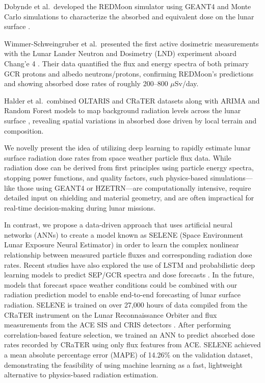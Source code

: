 \documentclass[conference]{IEEEtran}
\begin{document}
Dobynde et al.~developed the REDMoon simulator using GEANT4 and Monte Carlo simulations to characterize the absorbed and equivalent dose on the lunar surface \cite{2022cosp...44.2697D, Du2024}.

Wimmer-Schweingruber et al.~presented the first active dosimetric measurements with the Lunar Lander Neutron and Dosimetry (LND) experiment aboard Chang’e 4 \cite{Wimmer2020, Zhang2020}. Their data quantified the flux and energy spectra of both primary GCR protons and albedo neutrons/protons, confirming REDMoon’s predictions and showing absorbed dose rates of roughly 200–800 $\mu$Sv/day.

Halder et al.~combined OLTARIS and CRaTER datasets along with ARIMA and Random Forest models to map background radiation levels across the lunar surface \cite{Singleterry2010, Slaba2013}, revealing spatial variations in absorbed dose driven by local terrain and composition.

We novelly present the idea of utilizing deep learning to rapidly estimate lunar surface radiation dose rates from space weather particle flux data. While radiation dose can be derived from first principles using particle energy spectra, stopping power functions, and quality factors, such physics-based simulations—like those using GEANT4 or HZETRN—are computationally intensive, require detailed input on shielding and material geometry, and are often impractical for real-time decision-making during lunar missions.

In contrast, we propose a data-driven approach that uses artificial neural networks (ANNs)  to create a model known as SELENE (Space Environment Lunar Exposure Neural Estimator) in order to learn the complex nonlinear relationship between measured particle fluxes and corresponding radiation dose rates. Recent studies have also explored the use of LSTM and probabilistic deep learning models to predict SEP/GCR spectra and dose forecasts \cite{Papagiannopoulos2023, Zampieri2024}. In the future, models that forecast space weather conditions could be combined with our radiation prediction model to enable end-to-end forecasting of lunar surface radiation. SELENE is trained on over 27,000 hours of data compiled from the CRaTER instrument on the Lunar Reconnaissance Orbiter \cite{Looper2020} and flux measurements from the ACE SIS and CRIS detectors \cite{Stone1998SIS, Cummings1998}. After performing correlation-based feature selection, we trained an ANN to predict absorbed dose rates recorded by CRaTER using only flux features from ACE. SELENE achieved a mean absolute percentage error (MAPE) of 14.26\% on the validation dataset, demonstrating the feasibility of using machine learning as a fast, lightweight alternative to physics-based radiation estimation.
\end{document}
